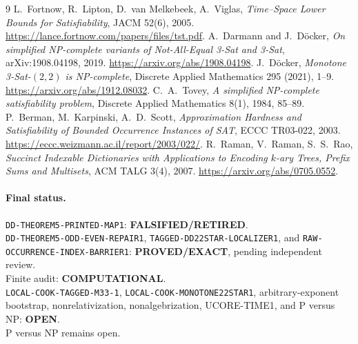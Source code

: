\documentclass[11pt]{article}
\newcommand{\EXACT}{\textbf{PROVED/EXACT}}
\newcommand{\OPEN}{\textbf{OPEN}}
\newcommand{\RETIRED}{\textbf{FALSIFIED/RETIRED}}
\newcommand{\COMP}{\textbf{COMPUTATIONAL}}
\begin{document}
\begin{thebibliography}{9}
L.~Fortnow, R.~Lipton, D.~van Melkebeek, A.~Viglas,
\emph{Time--Space Lower Bounds for Satisfiability}, JACM 52(6), 2005.
\url{https://lance.fortnow.com/papers/files/tst.pdf}.
A.~Darmann and J.~D\"ocker,
\emph{On simplified NP-complete variants of Not-All-Equal 3-Sat and 3-Sat},
arXiv:1908.04198, 2019. \url{https://arxiv.org/abs/1908.04198}.
J.~D\"ocker, \emph{Monotone 3-Sat-$(2,2)$ is NP-complete},
Discrete Applied Mathematics 295 (2021), 1--9.
\url{https://arxiv.org/abs/1912.08032}.
C.~A.~Tovey, \emph{A simplified NP-complete satisfiability problem},
Discrete Applied Mathematics 8(1), 1984, 85--89.
P.~Berman, M.~Karpinski, A.~D.~Scott,
\emph{Approximation Hardness and Satisfiability of Bounded Occurrence
Instances of SAT}, ECCC TR03-022, 2003.
\url{https://eccc.weizmann.ac.il/report/2003/022/}.
R.~Raman, V.~Raman, S.~S.~Rao,
\emph{Succinct Indexable Dictionaries with Applications to Encoding
$k$-ary Trees, Prefix Sums and Multisets}, ACM TALG 3(4), 2007.
\url{https://arxiv.org/abs/0705.0552}.
\end{thebibliography}

\paragraph{Final status.}
\texttt{DD-THEOREM5-PRINTED-MAP1}: \RETIRED.\\
\texttt{DD-THEOREM5-ODD-EVEN-REPAIR1},
\texttt{TAGGED-DD22STAR-LOCALIZER1}, and
\texttt{RAW-OCCURRENCE-INDEX-BARRIER1}: \EXACT, pending independent review.\\
Finite audit: \COMP.\\
\texttt{LOCAL-COOK-TAGGED-M33-1},
\texttt{LOCAL-COOK-MONOTONE22STAR1}, arbitrary-exponent bootstrap,
nonrelativization, nonalgebrization, UCORE-TIME1, and P versus NP: \OPEN.\\
P versus NP remains open.

\end{document}
